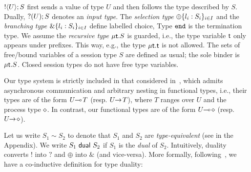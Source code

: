 $! \langle U \rangle ; S$ %
first sends a value of
type $U$ and then follows the type described by $S$.  Dually,
$? (U) ; S$ denotes an {\em input type}. 
The {\em selection type}
$\oplus \{l_i:S_i\}_{i \in I}$ 
and the 
{\em branching type}
$\& \{l_i:S_i\}_{i \in I}$ 
define labelled choice, 
Type $\mathtt{end}$ is the termination type. 
We assume the {\em recursive type} $\mu\mathsf{t}.S$ is guarded,
i.e., the type variable $\mathsf{t}$ only appears under prefixes. 
This way, 
e.g.,  the type $\mu\mathsf{t}.\mathsf{t}$ is not allowed. 
The sets of free/bound variables of a session type $S$ are defined as usual; 
the sole binder is $\mu\mathsf{t}.S$.
Closed session types do not have free type variables.




Our type system is strictly included in that considered in~\cite{tlca07,MostrousY15}, which admits asynchronous communication and arbitrary nesting in functional types, i.e., their types are of the form 
$U\!\! \multimap\!T$ 
(resp. $U\!\! \rightarrow\!T$),
where $T$ ranges over $U$ and the process type $\diamond$. 
In contrast, our functional types are of the form $U\!\! \multimap\! \diamond$ (resp. $U\!\! \rightarrow\! \diamond$). 

Let us write $S_1 \sim S_2$
to denote that $S_1$ and $S_2$ are \emph{type-equivalent} (see 
 in the Appendix).
We write $S_1 \ \mathsf{dual}\  S_2$ if 
$S_1$ is the \emph{dual} of $S_2$.   
Intuitively, 
duality
converts $!$ into $?$ and $\oplus$ into $\&$ (and vice-versa).
More formally, following~\cite{TGC14},
we have a co-inductive definition for 
type {duality}:

